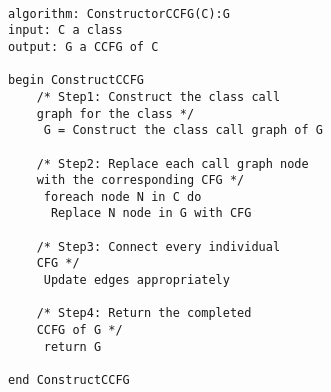 \documentclass[letterpaper,twocolumn,10pt]{article}
\begin{document}
\paragraph{}
\lstset{basicstyle=\small\ttfamily, tabsize=2}
\begin{lstlisting}
algorithm: ConstructorCCFG(C):G
input: C a class
output: G a CCFG of C

begin ConstructCCFG
	/* Step1: Construct the class call 
	graph for the class */ 
	 G = Construct the class call graph of G
	  
	/* Step2: Replace each call graph node 
	with the corresponding CFG */
	 foreach node N in C do
	  Replace N node in G with CFG

	/* Step3: Connect every individual 
	CFG */
	 Update edges appropriately 

	/* Step4: Return the completed 
	CCFG of G */
	 return G

end ConstructCCFG

\end{lstlisting}


{\footnotesize 

}



\theendnotes


\end{document}
